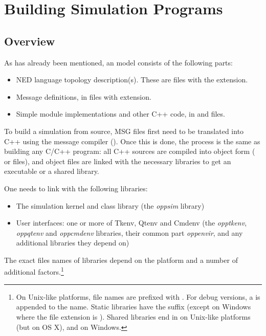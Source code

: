 \chapter{Building Simulation Programs}
\label{cha:build-sim-progs}

\section{Overview}
\label{sec:build-sim-progs:overview}

As has already been mentioned, an {\opp} model consists of
the following parts:

\begin{itemize}
  \item NED language topology description(s). These are files
        with the  extension.
  \item Message definitions, in files with  extension.
  \item Simple module implementations and other C++ code, in  and  files.
\end{itemize}

To build a simulation from source, MSG files first need
to be translated into C++ using the message compiler ().
Once this is done, the process is the same as building any C/C++ program:
all C++ sources are compiled into object form ( or  files),
and object files are linked with the necessary libraries to get an executable
or a shared library.

One needs to link with the following libraries:

\begin{itemize}
  \item The simulation kernel and class library (the \textit{oppsim} library)
  \item User interfaces: one or more of Tkenv, Qtenv and Cmdenv (the \textit{opptkenv},
        \textit{oppqtenv} and \textit{oppcmdenv} libraries, their common part \textit{oppenvir},
        and any additional libraries they depend on)
\end{itemize}

The exact files names of libraries depend on the platform and a number of
additional factors.\footnote{On Unix-like platforms, file names are
prefixed with . For debug versions, a  is appended to the
name. Static libraries have the  suffix (except on Windows where
the file extension is ). Shared libraries end in  on
Unix-like platforms (but  on OS X), and  on Windows.}

